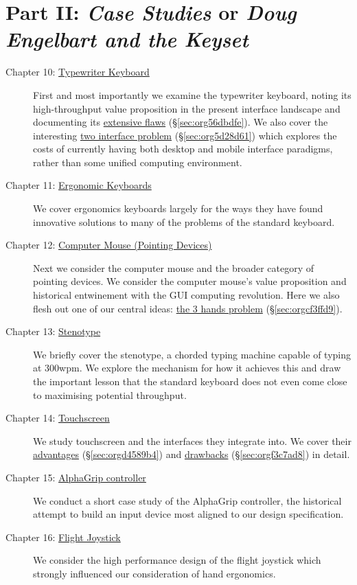 \documentclass[logo,bsc,singlespacing,parskip]{infthesis}
\begin{document}
\section*{Part II: \emph{Case Studies} or \emph{Doug Engelbart and the Keyset}}
\label{sec:orgdc333e6}
\begin{description}
\item[{Chapter 10: \hyperref[sec:org85cc7e5]{Typewriter Keyboard}}] First and most importantly we examine the typewriter keyboard, noting its high-throughput value proposition in the present interface landscape and documenting its \hyperref[sec:org56dbdfe]{extensive flaws} (\S \ref{sec:org56dbdfe}).
We also cover the interesting \hyperref[sec:org5d28d61]{two interface problem} (\S \ref{sec:org5d28d61}) which explores the costs of currently having both desktop and mobile interface paradigms, rather than some unified computing environment.

\item[{Chapter 11: \hyperref[sec:org54595c7]{Ergonomic Keyboards}}] We cover ergonomics keyboards largely for the ways they have found innovative solutions to many of the problems of the standard keyboard.

\item[{Chapter 12: \hyperref[sec:org60a15dc]{Computer Mouse (Pointing Devices)}}] Next we consider the computer mouse and the broader category of pointing devices.
We consider the computer mouse's value proposition and historical entwinement with the GUI computing revolution.
Here we also flesh out one of our central ideas: \hyperref[sec:orgcf3ffd9]{the 3 hands problem} (\S \ref{sec:orgcf3ffd9}).

\item[{Chapter 13: \hyperref[sec:org4fe9d7a]{Stenotype} }] We briefly cover the stenotype, a chorded typing machine capable of typing at 300wpm.
We explore the mechanism for how it achieves this and draw the important lesson that the standard keyboard does not even come close to maximising potential throughput.

\item[{Chapter 14:  \hyperref[sec:org43c6952]{Touchscreen}}] We study touchscreen and the interfaces they integrate into.
We cover their \hyperref[sec:orgd4589b4]{advantages} (\S \ref{sec:orgd4589b4}) and \hyperref[sec:orgf3c7ad8]{drawbacks} (\S \ref{sec:orgf3c7ad8}) in detail.

\item[{Chapter 15: \hyperref[sec:orgd782f4d]{AlphaGrip controller}}] We  conduct a short case study of the AlphaGrip controller, the historical attempt to build  an input device most aligned to our design specification.

\item[{Chapter 16: \hyperref[sec:org49ebdb8]{Flight Joystick}}] We consider the high performance design of the flight joystick which strongly influenced our consideration of hand ergonomics.
\end{description}
\end{document}
